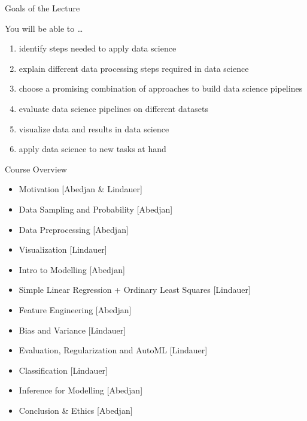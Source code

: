 \documentclass[aspectratio=169]{../latex_main/tntbeamer}  %
\begin{document}
\begin{frame}[c]{Goals of the Lecture}

You will be able to \ldots
\begin{enumerate}
  \item \alert{identify} steps needed to apply data science
  \item \alert{explain} different data processing steps required in data science
  \item \alert{choose} a promising combination of approaches to build data science pipelines
  \item \alert{evaluate} data science pipelines on different datasets
  \item \alert{visualize} data and results in data science
  \item \alert{apply} data science to new tasks at hand
\end{enumerate}

\end{frame}
\begin{frame}[c]{Course Overview}

\begin{itemize} 
    \item Motivation [Abedjan \& Lindauer] %
	\item Data Sampling and Probability [Abedjan] %
	\item Data Preprocessing [Abedjan] %
	\item Visualization [Lindauer] %
	\item Intro to Modelling [Abedjan] %
	\item Simple Linear Regression + Ordinary Least Squares [Lindauer] %
	\item Feature Engineering [Abedjan] %
	\item Bias and Variance [Lindauer] %
	\item Evaluation, Regularization and AutoML [Lindauer] %
	\item Classification [Lindauer] %
	\item Inference for Modelling [Abedjan] %
	\item Conclusion \& Ethics [Abedjan] %
\end{itemize}


\end{frame}
\end{document}
